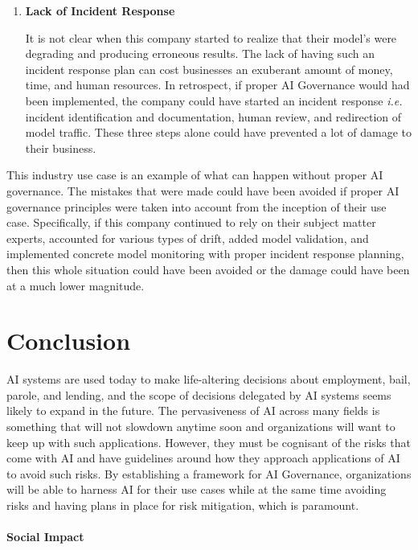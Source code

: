 \documentclass{article}
\begin{document}
\begin{enumerate}
    \item \textbf {Lack of Incident Response}
    
    \smallskip It is not clear when this company started to realize that their model's were degrading and producing erroneous results. 
    The lack of having such an incident response plan can cost businesses an exuberant amount of money, time, and human resources. %
    In retrospect, if proper AI Governance would had been implemented, the company could have started an incident response \emph{i.e.} incident identification and documentation, human review, and redirection of model traffic. %
    These three steps alone could have prevented a lot of damage to their business. 
    
\end{enumerate}

This industry use case is an example of what can happen without proper AI governance. The mistakes that were made could have been avoided if proper AI governance principles were taken into account from the inception of their use case. Specifically, if this company continued to rely on their subject matter experts, accounted for various types of drift, added model validation, and implemented concrete model monitoring with proper incident response planning, then this whole situation could have been avoided or the damage could have been at a much lower magnitude. 


\section{Conclusion}
AI systems are used today to make life-altering decisions about employment, bail, parole, and lending, and the scope of decisions delegated by AI systems seems likely to expand in the future. The pervasiveness of AI across many fields is something that will not slowdown anytime soon and organizations will want to keep up with such applications. However, they must be cognisant of the risks that come with AI and have guidelines around how they approach applications of AI to avoid such risks. By establishing a framework for AI Governance, organizations will be able to harness AI for their use cases while at the same time avoiding risks and having plans in place for risk mitigation, which is paramount.

\paragraph{Social Impact}
\end{document}
